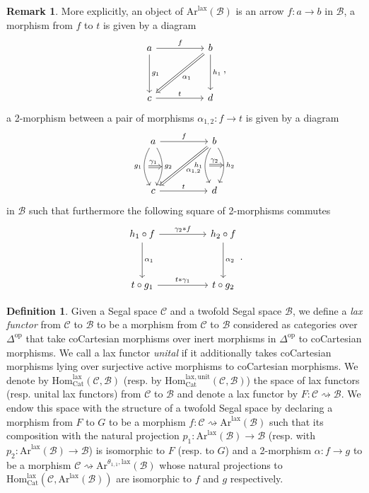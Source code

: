 \documentclass[a4paper, reqno]{amsart}
\theoremstyle{definition}
\newtheorem{defn}[theorem]{Definition}
\newtheorem{remark}[theorem]{Remark}
\newcommand\cB{\mathscr B}
\newcommand\cC{\mathscr C}
\newcommand\mor{\mathrm{Hom}}
\newcommand\op{\mathrm{op}}
\newcommand\cat{\mathrm{Cat}}
\newcommand\arr{\mathrm{Ar}}
\newcommand\lax{\mathrm{lax}}
\newcommand\un{\mathrm{unit}}
\begin{document}
\begin{remark}
More explicitly, an object of $\arr^\lax(\cB)$ is an arrow $f:a\rightarrow b$ in $\cB$, a morphism from $f$ to $t$ is given by a diagram
\[
 \begin{tikzcd}[row sep=huge, column sep=huge]
 a\arrow[r, "f"]\arrow[d, "g_1"]&b\arrow[dl, Rightarrow, "\alpha_1"]\arrow[d, "h_1"]\\
 c\arrow[r, "t"]&d
 \end{tikzcd},
 \]
 a 2-morphism between a pair of morphisms $\alpha_{1,2}:f\rightarrow t$ is given by a diagram
 \[
 \begin{tikzcd}[row sep=huge, column sep=huge]
 a\arrow[r, "f"]\arrow[d, "g_2"{name=O2}, bend left=30]\arrow[d, "g_1"{name=O1, swap}, bend right=30]&b\arrow[dl, Rightarrow, "\alpha_{1,2}"]\arrow[d, "h_2"{name=C2}, bend left=30]\arrow[d, "h_1"{name=C1, swap}, bend right=30]\\
 c\arrow[r, "t"]&d\arrow[Rightarrow, from=O1,to=O2, shorten <=1ex, "\gamma_1"]\arrow[Rightarrow, from=C1,to=C2, shorten <=1ex, "\gamma_2"]
 \end{tikzcd}
 \]
 in $\cB$ such that furthermore the following square of 2-morphisms commutes
 \[
 \begin{tikzcd}[row sep=huge, column sep=huge]
 h_1\circ f\arrow[r, "\gamma_2*f"]\arrow[d, "\alpha_1"]&h_2\circ f\arrow[d, "\alpha_2"]\\
 t\circ g_1\arrow[r, "t*\gamma_1"]&t\circ g_2
 \end{tikzcd}.
 \]
\end{remark}
\begin{defn}
Given a Segal space $\cC$ and a twofold Segal space $\cB$, we define a \textit{lax functor} from $\cC$ to $\cB$ to be a morphism from $\cC$ to $\cB$ considered as categories over $\Delta^\op$ that take coCartesian morphisms over inert morphisms in $\Delta^\op$ to coCartesian morphisms. We call a lax functor \textit{unital} if it additionally takes coCartesian morphisms lying over surjective active morphisms to coCartesian morphisms. We denote by $\mor^\lax_\cat(\cC,\cB)$ (resp. by $\mor_\cat^{\lax,\un}(\cC,\cB)$) the space of lax functors (resp. unital lax functors) from $\cC$ to $\cB$ and denote a lax functor by $F:\cC\rightsquigarrow\cB$. We endow this space with the structure of a twofold Segal space by declaring a morphism from $F$ to $G$ to be a morphism $f:\cC\rightsquigarrow \arr^\lax(\cB)$  such that its composition with the natural projection $p_1:\arr^\lax(\cB)\rightarrow \cB$ (resp. with $p_2:\arr^\lax(\cB)\rightarrow\cB$) is isomorphic to $F$ (resp. to $G$) and a 2-morphism $\alpha:f\rightarrow g$ to be a morphism $\cC\rightsquigarrow\arr^{\theta_{1,1},\lax}(\cB)$ whose natural projections to $\mor_\cat^\lax(\cC,\arr^\lax(\cB))$ are isomorphic to $f$ and $g$ respectively.
\end{defn}
\end{document}
